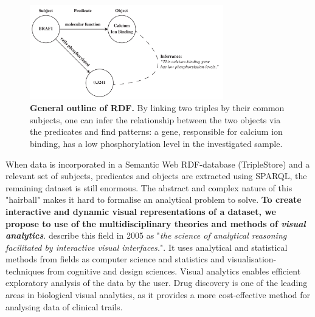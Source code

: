 \documentclass[twoside,fontsize=10pt]{article}
\begin{document}
\begin{figure}[H]
    \centering
    \includegraphics[width=0.75\textwidth]{rdf}
    \caption{\textbf{General outline of RDF.} By linking two triples by their common subjects, one can infer the relationship between the two objects via the predicates and find patterns: a gene, responsible for calcium ion binding, has a low phosphorylation level in the investigated sample.}
    \label{fig:rdf}
\end{figure}
\noindent
When data is incorporated in a Semantic Web RDF-database (TripleStore) and a relevant set of subjects, predicates and objects are extracted using SPARQL, the remaining dataset is still enormous. The abstract and complex nature of this "hairball" makes it hard to formalise an analytical problem to solve. \textbf{To create interactive and dynamic visual representations of a dataset, we propose to use of the multidisciplinary theories and methods of \textit{visual analytics}}. \citet{Thomas2005} describe this field in 2005 as "\textit{the science of analytical reasoning facilitated by interactive visual interfaces.}". It uses analytical and statistical methods from fields as computer science and statistics and visualisation-techniques from cognitive and design sciences. Visual analytics enables efficient exploratory analysis of the data by the user. Drug discovery is one of the leading areas in biological visual analytics, as it provides a more cost-effective method for analysing data of clinical trails\cite{Cao2008}.
\end{document}
